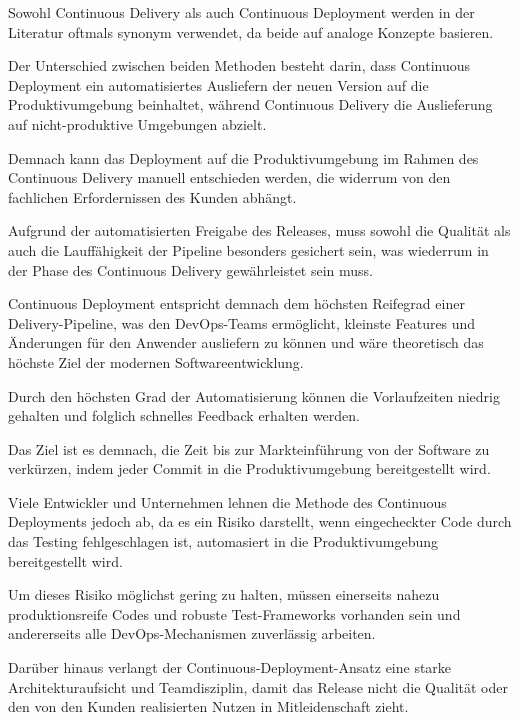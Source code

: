 Sowohl Continuous Delivery als auch Continuous Deployment werden in der Literatur oftmals synonym verwendet, da beide auf analoge Konzepte basieren. 

Der Unterschied zwischen beiden Methoden besteht darin, dass Continuous Deployment ein automatisiertes Ausliefern der neuen Version auf die Produktivumgebung beinhaltet, während Continuous Delivery die Auslieferung auf nicht-produktive Umgebungen abzielt. 

Demnach kann das Deployment auf die Produktivumgebung im Rahmen des Continuous Delivery manuell entschieden werden, die widerrum von den fachlichen Erfordernissen des Kunden abhängt. \cite[S. 29 - 30]{alt_innovationsorientiertes_2017} 

Aufgrund der automatisierten Freigabe des Releases, muss sowohl die Qualität als auch die Lauffähigkeit der Pipeline besonders gesichert sein, was wiederrum in der Phase des Continuous Delivery gewährleistet sein muss. \cite[S. 269]{tiemeyer_handbuch_2021} 

Continuous Deployment entspricht demnach dem höchsten Reifegrad einer Delivery-Pipeline, was den DevOps-Teams ermöglicht, kleinste Features und Änderungen für den Anwender ausliefern zu können und wäre theoretisch das höchste Ziel der modernen Softwareentwicklung. \cite{humble_why_2011}  

Durch den höchsten Grad der Automatisierung können die Vorlaufzeiten niedrig gehalten und folglich schnelles Feedback erhalten werden. \cite{humble_why_2011}   

Das Ziel ist es demnach, die Zeit bis zur Markteinführung von der Software zu verkürzen, indem jeder Commit in die Produktivumgebung bereitgestellt wird. 

Viele Entwickler und Unternehmen lehnen die Methode des Continuous Deployments jedoch ab, da es ein Risiko darstellt, wenn eingecheckter Code durch das Testing fehlgeschlagen ist, automasiert in die Produktivumgebung bereitgestellt wird. \cite[S. 269]{tiemeyer_handbuch_2021}  

Um dieses Risiko möglichst gering zu halten, müssen einerseits nahezu produktionsreife Codes und robuste Test-Frameworks vorhanden sein und andererseits alle DevOps-Mechanismen zuverlässig arbeiten. \cite[S. 269]{tiemeyer_handbuch_2021}  

Darüber hinaus verlangt der Continuous-Deployment-Ansatz eine starke Architekturaufsicht und Teamdisziplin, damit das Release nicht die Qualität oder den von den Kunden realisierten Nutzen in Mitleidenschaft zieht.\cite[S. 119 - 120]{erder_continuous_2016} 

